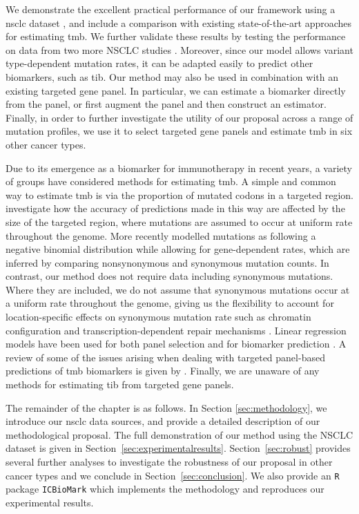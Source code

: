 \documentclass[../thesis.tex]{subfiles}
\begin{document}
We demonstrate the excellent practical performance of our framework using a \gls{nsclc} dataset {\citep{campbell_distinct_2016}}, and include a comparison with existing state-of-the-art approaches for estimating \gls{tmb}. {We further validate these results by testing the performance on data from {two more NSCLC studies \citep{hellmann_genomic_2018, rizvi_mutational_2015}}}.  Moreover, since our model allows variant type-dependent mutation rates, it can be adapted easily to predict other biomarkers, such as \gls{tib}. Our method may also be used in combination with an existing targeted gene panel. In particular, we can estimate a biomarker directly from the panel, or first augment the panel and then construct an estimator.  {Finally, in order to further investigate the utility of our proposal across a range of mutation profiles, we use it to select targeted gene panels and estimate \gls{tmb} in six other cancer types.} 

Due to its emergence as a biomarker for immunotherapy in recent years, a variety of groups have considered methods for estimating \gls{tmb}. A simple and common way to estimate \gls{tmb} is via the proportion of mutated codons in a targeted region. \citet{budczies_optimizing_2019} investigate how the accuracy of predictions made in this way are affected by the size of the targeted region, where mutations are assumed to occur at uniform rate throughout the genome. More recently \citet{yao_ectmb_2020} modelled mutations as following a negative binomial distribution while allowing for gene-dependent rates, which are inferred by comparing nonsynonymous and synonymous mutation counts. In contrast, our method does not require data including synonymous mutations. Where they are included, we do not assume that synonymous mutations occur at a uniform rate throughout the genome, giving us the flexibility to account for location-specific effects on synonymous mutation rate such as chromatin configuration \citep{makova_effects_2015} and transcription-dependent repair mechanisms \citep{fong_intertwined_2013}. Linear regression models have been used for both panel selection \citep{lyu_mutation_2018} and for biomarker prediction \citep{guo_exon_2020}. A review of some of the issues arising when dealing with targeted panel-based predictions of \gls{tmb} biomarkers is given by \citet{wu_designing_2019}. Finally, we are unaware of any methods for estimating \gls{tib} from targeted gene panels. 

The remainder of the chapter is as follows. In Section \ref{sec:methodology}, we introduce our \gls{nsclc} data sources, and provide a detailed description of our methodological proposal.  {The full demonstration of our method using the NSCLC dataset is}  given in Section~\ref{sec:experimentalresults}. {Section~\ref{sec:robust} provides several further analyses to investigate the robustness of our proposal in other cancer types} and we conclude in Section~\ref{sec:conclusion}.  We also provide an \texttt{R} package \texttt{ICBioMark} \citep{bradley_icbiomark_2021} which implements the methodology and reproduces our experimental results. 
\end{document}
